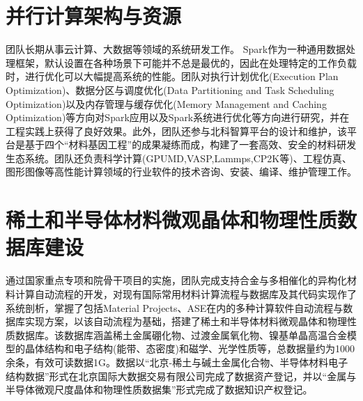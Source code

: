 \section{并行计算架构与资源}
团队长期从事云计算、大数据等领域的系统研发工作。%
\textrm{Spark}作为一种通用数据处理框架，默认设置在各种场景下可能并不总是最优的，因此在处理特定的工作负载时，进行优化可以大幅提高系统的性能。团队对执行计划优化\textrm{(Execution Plan Optimization)}、数据分区与调度优化\textrm{(Data Partitioning and Task Scheduling Optimization)}以及内存管理与缓存优化\textrm{(Memory Management and Caching Optimization)}等方向对\textrm{Spark}应用以及\textrm{Spark}系统进行优化等方向进行研究，并在工程实践上获得了良好效果。此外，团队还参与北科智算平台的设计和维护，该平台是基于四个``材料基因工程''的成果凝练而成，构建了一套高效、安全的材料研发生态系统。团队还负责科学计算\textrm{(GPUMD,VASP,Lammps,CP2K等)}、工程仿真、图形图像等高性能计算领域的行业软件的技术咨询、安装、编译、维护管理工作。%


\section{稀土和半导体材料微观晶体和物理性质数据库建设}
通过国家重点专项和院骨干项目的实施，团队完成支持合金与多相催化的异构化材料计算自动流程的开发，对现有国际常用材料计算流程与数据库及其代码实现作了系统剖析，掌握了包括\textrm{Material Projects}、\textrm{ASE}在内的多种计算软件自动流程与数据库实现方案，以该自动流程为基础，搭建了稀土和半导体材料微观晶体和物理性质数据库。该数据库涵盖稀土金属硼化物、过渡金属氧化物、镍基单晶高温合金模型的晶体结构和电子结构(能带、态密度)和磁学、光学性质等，总数据量约为1000余条，有效可读数据1G。数据以``北京-稀土与碱土金属化合物、半导体材料电子结构数据''形式在北京国际大数据交易有限公司完成了数据资产登记，并以``金属与半导体微观尺度晶体和物理性质数据集''形式完成了数据知识产权登记。

